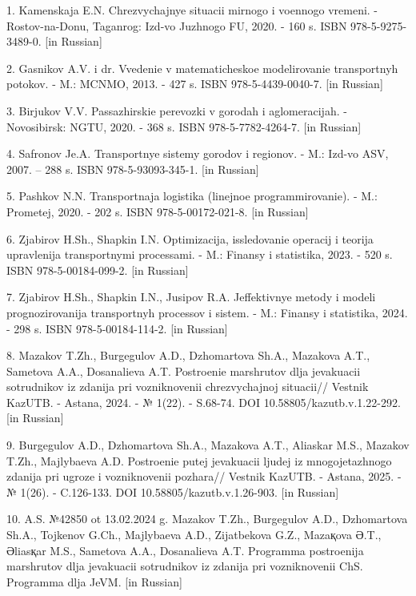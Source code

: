\begin{refs}
1. Kamenskaja E.N. Chrezvychajnye situacii mirnogo i voennogo vremeni. -
Rostov-na-Donu, Taganrog: Izd-vo Juzhnogo FU, 2020. - 160 s. ISBN
978-5-9275-3489-0. {[}in Russian{]}

2. Gasnikov A.V. i dr. Vvedenie v matematicheskoe modelirovanie
transportnyh potokov. - M.: MCNMO, 2013. - 427 s. ISBN
978-5-4439-0040-7. {[}in Russian{]}

3. Birjukov V.V. Passazhirskie perevozki v gorodah i aglomeracijah. -
Novosibirsk: NGTU, 2020. - 368 s. ISBN 978-5-7782-4264-7. {[}in
Russian{]}

4. Safronov Je.A. Transportnye sistemy gorodov i regionov. - M.: Izd-vo
ASV, 2007. -- 288 s. ISBN 978-5-93093-345-1. {[}in Russian{]}

5. Pashkov N.N. Transportnaja logistika (linejnoe programmirovanie). -
M.: Prometej, 2020. - 202 s. ISBN 978-5-00172-021-8. {[}in Russian{]}

6. Zjabirov H.Sh., Shapkin I.N. Optimizacija, issledovanie operacij i
teorija upravlenija transportnymi processami. - M.: Finansy i
statistika, 2023. - 520 s. ISBN 978-5-00184-099-2. {[}in Russian{]}

7. Zjabirov H.Sh., Shapkin I.N., Jusipov R.A. Jeffektivnye metody i
modeli prognozirovanija transportnyh processov i sistem. - M.: Finansy i
statistika, 2024. - 298 s. ISBN 978-5-00184-114-2. {[}in Russian{]}

8. Mazakov T.Zh., Burgegulov A.D., Dzhomartova Sh.A., Mazakova A.T.,
Sametova A.A., Dosanalieva A.T. Postroenie marshrutov dlja jevakuacii
sotrudnikov iz zdanija pri vozniknovenii chrezvychajnoj situacii//
Vestnik KazUTB. - Astana, 2024. - № 1(22). - S.68-74. DOI
10.58805/kazutb.v.1.22-292. {[}in Russian{]}

9. Burgegulov A.D., Dzhomartova Sh.A., Mazakova A.T., Aliaskar M.S.,
Mazakov T.Zh., Majlybaeva A.D. Postroenie putej jevakuacii ljudej iz
mnogojetazhnogo zdanija pri ugroze i vozniknovenii pozhara// Vestnik
KazUTB. - Astana, 2025. - № 1(26). - C.126-133. DOI
10.58805/kazutb.v.1.26-903. {[}in Russian{]}

10. A.S. №42850 ot 13.02.2024 g. Mazakov T.Zh., Burgegulov A.D.,
Dzhomartova Sh.A., Tojkenov G.Ch., Majlybaeva A.D., Zijatbekova G.Z.,
Mazaқova Ә.T., Әliasқar M.S., Sametova A.A., Dosanalieva A.T. Programma
postroenija marshrutov dlja jevakuacii sotrudnikov iz zdanija pri
vozniknovenii ChS. Programma dlja JeVM. {[}in Russian{]}
\end{refs}


